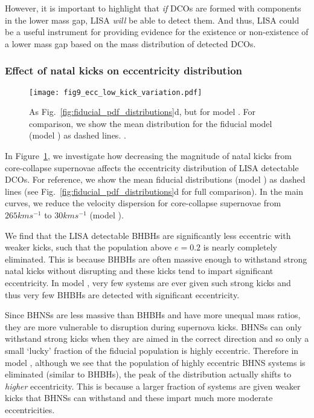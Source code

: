 However, it is important to highlight that \textit{if} DCOs are formed with components in the lower mass gap, LISA \textit{will} be able to detect them. And thus, LISA could be a useful instrument for providing evidence for the existence or non-existence of a lower mass gap based on the mass distribution of detected DCOs.

\subsubsection{Effect of natal kicks on eccentricity distribution}

\begin{figure}[tb]
    \centering
    \texttt{[image: fig9\_ecc\_low\_kick\_variation.pdf]}
    \caption{As Fig.~\ref{fig:fiducial_pdf_distributions}d, but for model \modSigLower{}. For comparison, we show the mean distribution for the fiducial model (model \modFid{}) as dashed lines. \href{https://github.com/TomWagg/detecting-DCOs-in-LISA/blob/main/paper/figures/fig9_ecc_low_kick_variation.pdf}{\faFileImage} \href{https://github.com/TomWagg/detecting-DCOs-in-LISA/blob/main/paper/figure_notebooks/variations.ipynb}{\faBook}.}
    \label{fig:ecc_low_kick_variation}
\end{figure}

In Figure~\ref{fig:ecc_low_kick_variation}, we investigate how decreasing the magnitude of natal kicks from core-collapse supernovae affects the eccentricity distribution of LISA detectable DCOs. For reference, we show the mean fiducial distributions (model \modFid{}) as dashed lines (see Fig.~\ref{fig:fiducial_pdf_distributions}d for full comparison). In the main curves, we reduce the velocity dispersion for core-collapse supernovae from $265 \unit{km}{s^{-1}}$ to $30 \unit{km}{s^{-1}}$ (model \modSigLower{}).

We find that the LISA detectable BHBHs are significantly less eccentric with weaker kicks, such that the population above $e = 0.2$ is nearly completely eliminated. This is because BHBHs are often massive enough to withstand strong natal kicks without disrupting and these kicks tend to impart significant eccentricity. In model \modSigLower{}, very few systems are ever given such strong kicks and thus very few BHBHs are detected with significant eccentricity.

Since BHNSs are less massive than BHBHs and have more unequal mass ratios, they are more vulnerable to disruption during supernova kicks. BHNSs can only withstand strong kicks when they are aimed in the correct direction and so only a small `lucky' fraction of the fiducial population is highly eccentric. Therefore in model \modSigLower{}, although we see that the population of highly eccentric BHNS systems is eliminated (similar to BHBHs), the peak of the distribution actually shifts to \textit{higher} eccentricity. This is because a larger fraction of systems are given weaker kicks that BHNSs can withstand and these impart much more moderate eccentricities.

